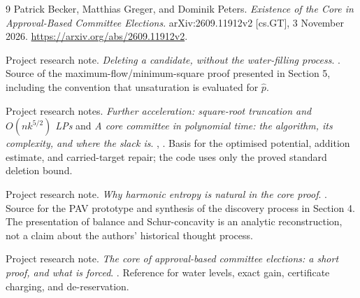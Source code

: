 \documentclass[11pt,a4paper]{article}
\theoremstyle{definition}
\theoremstyle{remark}
\begin{document}
\begin{thebibliography}{9}
Patrick Becker, Matthias Greger, and Dominik Peters.
\emph{Existence of the Core in Approval-Based Committee Elections}.
arXiv:2609.11912v2 [cs.GT], 3 November 2026.
\href{https://arxiv.org/abs/2609.11912v2}{https://arxiv.org/abs/2609.11912v2}.

Project research note.
\emph{Deleting a candidate, without the water-filling process}.
. Source of the maximum-flow/minimum-square proof presented in Section 5, including the convention that unsaturation is evaluated for $\hat p$.

Project research notes.
\emph{Further acceleration: square-root truncation and $O(nk^{5/2})$ LPs} and
\emph{A core committee in polynomial time: the algorithm, its complexity, and where the slack is}.
, . Basis for the optimised potential, addition estimate, and carried-target repair; the code uses only the proved standard deletion bound.

Project research note.
\emph{Why harmonic entropy is natural in the core proof}.
. Source for the PAV prototype and synthesis of the discovery process in Section 4. The presentation of balance and Schur-concavity is an analytic reconstruction, not a claim about the authors' historical thought process.

Project research note.
\emph{The core of approval-based committee elections: a short proof, and what is forced}.
. Reference for water levels, exact gain, certificate charging, and de-reservation.
\end{thebibliography}

\clearpage
\appendix
\end{document}

